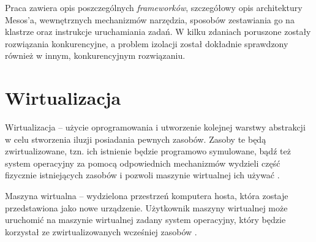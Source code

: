 \documentclass[10pt,a4paper,titlepage,twoside]{report}
\begin{document}
Praca zawiera opis poszczególnych \textit{frameworków}, szczegółowy opis architektury Mesos’a, wewnętrznych mechanizmów narzędzia, sposobów zestawiania go na klastrze oraz instrukcje uruchamiania zadań. W kilku zdaniach poruszone zostały rozwiązania konkurencyjne, a problem izolacji został dokładnie sprawdzony również w innym, konkurencyjnym rozwiązaniu.

\section{Wirtualizacja}
\indent \indent Wirtualizacja – użycie oprogramowania i utworzenie kolejnej warstwy abstrakcji w celu stworzenia iluzji posiadania pewnych zasobów. Zasoby te będą zwirtualizowane, tzn. ich istnienie będzie programowo symulowane, bądź też system operacyjny za pomocą odpowiednich mechanizmów wydzieli część fizycznie istniejących zasobów i pozwoli maszynie wirtualnej ich używać \cite{ad15}.

Maszyna wirtualna – wydzielona przestrzeń komputera hosta, która zostaje przedstawiona jako nowe urządzenie. Użytkownik maszyny wirtualnej może uruchomić na maszynie wirtualnej zadany system operacyjny, który będzie korzystał ze zwirtualizowanych wcześniej zasobów \cite{ad15}.
\end{document}
